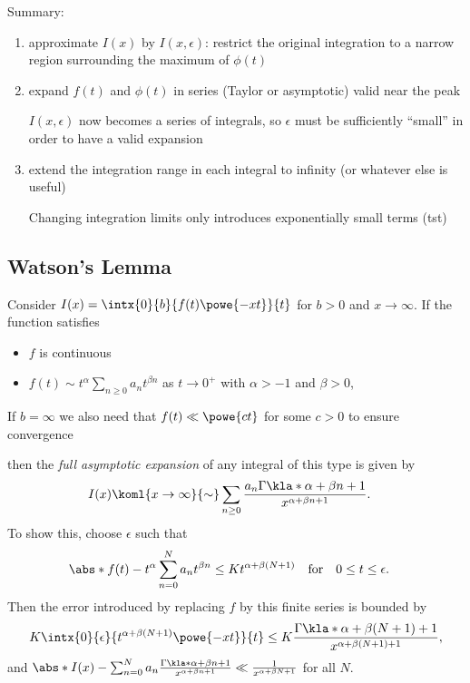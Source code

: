\documentclass[english, parskip=full]{scrbook}
\newcommand{\definition}[2]{\begin{tcolorbox}[colback=colorbackgrounddefinition,colframe=colordefinition, breakable,enhanced,title=\textbf{#1}.]#2\end{tcolorbox}}
\newcommand{\note}[1]{\begin{tcolorbox}[colback=colorbackgroundnote,colframe=colornote, breakable,enhanced]#1\end{tcolorbox}}
\begin{document}
Summary:
\begin{enumerate}
\item approximate $I(x)$ by $I(x,\epsilon)$: restrict the original integration to a narrow region surrounding the maximum of $\phi(t)$
\item expand $f(t)$ and $\phi(t)$ in series (Taylor or asymptotic) valid near the peak
\note{$I(x,\epsilon)$ now becomes a series of integrals, so $\epsilon$ must be sufficiently ``small'' in order to have a valid expansion}
\item extend the integration range in each integral to infinity (or whatever else is useful)
\note{Changing integration limits only introduces exponentially small terms (\gls{tst})}
\end{enumerate}
\subsection{Watson's Lemma}
\definition{Watson's Lemma}{Consider $I(x) = \intx{0}{b}{f(t) \powe{-xt}}{t}$ for $b>0$ and $x\rightarrow \infty$.
If the function satisfies
\begin{itemize}
\item $f$ is continuous
\item $f(t) \sim t^\alpha \sum_{n\ge 0} a_n t^{\beta n}$ as $t\rightarrow 0^+$ with $\alpha > -1$ and $\beta > 0$,
\end{itemize}
\note{If $b=\infty$ we also need that $f(t)\ll \powe{ct}$ for some $c>0$ to ensure convergence}
then the \emph{full asymptotic expansion} of any integral of this type is given by
\begin{align}
I(x) &\koml{x\rightarrow\infty}{\sim} \sum_{n\ge 0} \frac{a_n \Gamma\kla*{\alpha + \beta n+ 1}}{x^{\alpha + \beta n + 1}}.
\end{align}
To show this, choose $\epsilon$ such that
\begin{align}
\abs*{f(t) - t^\alpha \sum_{n=0}^N a_n t^{\beta n}} &\le K t^{\alpha + \beta (N+1)} \quad \text{for} \quad 0\le t \le \epsilon.
\end{align}
Then the error introduced by replacing $f$ by this finite series is bounded by
\begin{align}
K\intx{0}{\epsilon}{t^{\alpha + \beta (N+1)} \powe{-xt}}{t} \le K \frac{\Gamma\kla*{\alpha + \beta(N+1)+1}}{x^{\alpha + \beta(N+1)+1}},
\end{align}
and $\abs*{I(x) - \sum_{n=0}^N a_n \frac{\Gamma\kla*{\alpha + \beta n + 1}}{x^{\alpha + \beta n + 1}}} \ll \frac{1}{x^{\alpha + \beta N + 1}}$ for all $N$.
}
\end{document}
